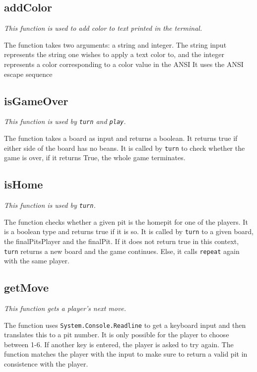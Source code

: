 \documentclass[a4paper]{report}
\begin{document}
\subsection*{addColor}
{\it This function is used to add color to text printed in the terminal.}

The function takes two arguments: a string and integer. The string input represents the string one wishes to apply a text color to, and the integer represents a color corresponding to a color value in the ANSI
It uses the ANSI escape sequence 

\subsection*{isGameOver}
{\it This function is used by \texttt{turn} and \texttt{play}.}

The function takes a board as input and returns a boolean. It returns true if either side of the board has no beans. It is called by \texttt{turn} to check whether the game is over, if it returns True, the whole game terminates.

\subsection*{isHome}
{\it This function is used by \texttt{turn}.}

The function checks whether a given pit is the homepit for one of the players. It is a boolean type and returns true if it is so.
It is called by \texttt{turn} to a given board, the finalPitsPlayer and the finalPit. If it does not return true in this context, \texttt{turn} returns a new board and the game continues. Else, it calls \texttt{repeat} again with the same player.

\subsection*{getMove}
{\it This function gets a player's next move.}

The function uses \texttt{System.Console.Readline} to get a keyboard input and then translates this to a pit number. It is only possible for the player to choose between 1-6. If another key is entered, the player is asked to try again. The function matches the player with the input to make sure to return a valid pit in consistence with the player.
\end{document}
